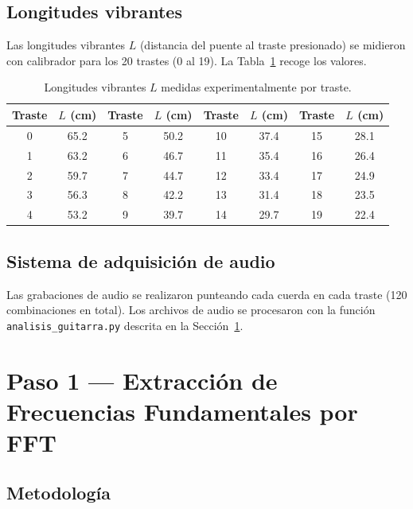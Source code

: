 \documentclass[12pt,a4paper]{article}
\begin{document}
\subsection{Longitudes vibrantes}

Las longitudes vibrantes $L$ (distancia del puente al traste presionado)
se midieron con calibrador para los 20 trastes (0 al 19). La
Tabla~\ref{tab:distancias} recoge los valores.

\begin{table}[H]
\centering
\caption{Longitudes vibrantes $L$ medidas experimentalmente por traste.}
\label{tab:distancias}
\smallskip
\begin{tabular}{cc|cc|cc|cc}
\toprule
\textbf{Traste} & $L$ (cm) & \textbf{Traste} & $L$ (cm)
& \textbf{Traste} & $L$ (cm) & \textbf{Traste} & $L$ (cm)\\
\midrule
 0 & 65.2 &  5 & 50.2 & 10 & 37.4 & 15 & 28.1 \\
 1 & 63.2 &  6 & 46.7 & 11 & 35.4 & 16 & 26.4 \\
 2 & 59.7 &  7 & 44.7 & 12 & 33.4 & 17 & 24.9 \\
 3 & 56.3 &  8 & 42.2 & 13 & 31.4 & 18 & 23.5 \\
 4 & 53.2 &  9 & 39.7 & 14 & 29.7 & 19 & 22.4 \\
\bottomrule
\end{tabular}
\end{table}

\subsection{Sistema de adquisición de audio}

Las grabaciones de audio se realizaron punteando cada cuerda en cada traste
(120 combinaciones en total). Los archivos de audio se procesaron con la
función \texttt{analisis\_guitarra.py} descrita en la Sección~\ref{sec:paso1}.

\section{Paso 1 — Extracción de Frecuencias Fundamentales por FFT}
\label{sec:paso1}

\subsection{Metodología}
\end{document}
